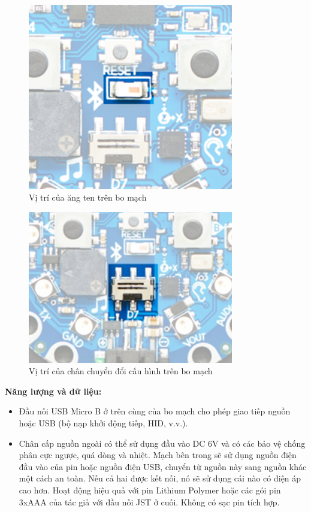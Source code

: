 \begin{figure}[!]
		\centering
 		\includegraphics[width=0.8\textwidth]{images/angten.png}
		\caption{Vị trí của ăng ten trên bo mạch}
		\label{angten}
\end{figure}

\begin{figure}[!]
		\centering
 		\includegraphics[width=0.8\textwidth]{images/switch.png}
		\caption{Vị trí của chân chuyển đổi cấu hình trên bo mạch}
		\label{switch}
\end{figure}

\textbf{Năng lượng và dữ liệu:}
\begin{itemize}
    \item Đầu nối USB Micro B ở trên cùng của bo mạch cho phép giao tiếp nguồn hoặc USB (bộ nạp khởi động tiếp, HID, v.v.). 
    \item Chân cấp nguồn ngoài có thể sử dụng đầu vào DC 6V và có các bảo vệ chống phân cực ngược, quá dòng và nhiệt. Mạch bên trong sẽ sử dụng nguồn điện đầu vào của pin hoặc nguồn điện USB, chuyển từ nguồn này sang nguồn khác một cách an toàn. Nếu cả hai được kết nối, nó sẽ sử dụng cái nào có điện áp cao hơn. Hoạt động hiệu quả với pin Lithium Polymer hoặc các gói pin 3xAAA của tác giả với đầu nối JST ở cuối. Không có sạc pin tích hợp.
\end{itemize}


